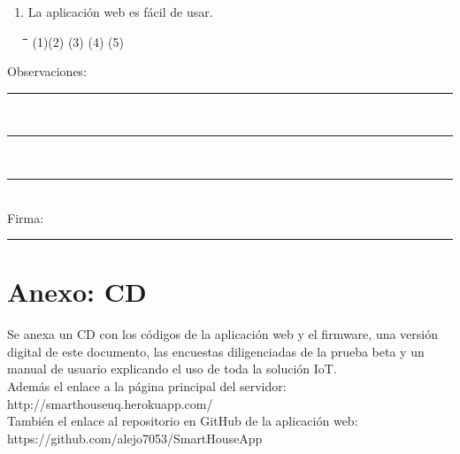\begin{appendix}
\begin{enumerate}
	\item La aplicación web es fácil de usar.

\begin{tabbing}
	\hspace{2cm}\=\hspace{2cm}\=\hspace{2cm}\=\hspace{2cm}\=\kill
	(1)\>(2)  \>(3)  \>(4)  \>(5) 
\end{tabbing} 

\end{enumerate}

Observaciones: \rule{13.5cm}{0.1mm}\\
\rule{16.3cm}{0.1mm}\\
\rule{16.3cm}{0.1mm}\\

Firma: \rule{5cm}{0.1mm}

\chapter{Anexo: CD}

Se anexa un CD con los códigos de la aplicación web y el firmware, una versión digital de este documento, las encuestas diligenciadas de la prueba beta y un manual de usuario explicando el uso de toda la solución IoT.\\

Además el enlace a la página principal del servidor: http://smarthouseuq.herokuapp.com/\\

También el enlace al repositorio en GitHub de la aplicación web:\\ https://github.com/alejo7053/SmartHouseApp

\end{appendix}
